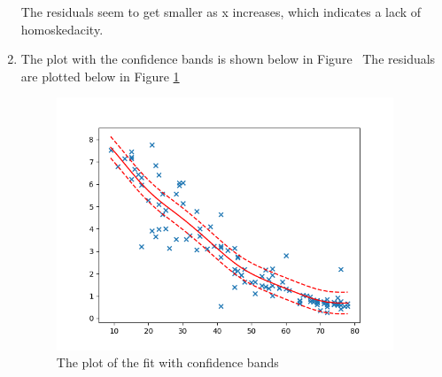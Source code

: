 \documentclass[10pt]{article}
\begin{document}
\begin{enumerate}[label=(\Alph*)]
		The residuals seem to get smaller as x increases, which indicates a lack of homoskedacity.

		\item
		The plot with the confidence bands is shown below in Figure \
     	The residuals are plotted below in Figure \ref{fig:local_linear_estimate}
		\begin{figure}[htb] \centering
		\includegraphics[width=0.95\textwidth]{./local_estimate.png}
		\caption{The plot of the fit with confidence bands}
		\label{fig:local_linear_estimate}
		\end{figure}

	\end{enumerate}
\end{document}
